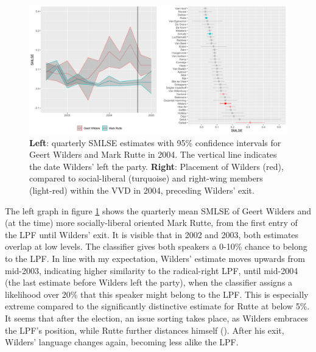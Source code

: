 \documentclass{article}
\begin{document}
\begin{figure}
\includegraphics[width=\linewidth]{NL/vis/Wilders_both.png}
\caption{\textbf{Left}: quarterly SMLSE estimates with 95\% confidence intervals for Geert Wilders and Mark Rutte in 2004. The vertical line indicates the date Wilders' left the party. \textbf{Right}: Placement of Wilders (red), compared to social-liberal (turquoise) and right-wing members (light-red) within the VVD in 2004, preceding Wilders' exit.}
\label{fig:wilders}
\end{figure}

The left graph in figure \ref{fig:wilders} shows the quarterly mean SMLSE of Geert Wilders and (at the time) more socially-liberal oriented Mark Rutte, from the first entry of the LPF until Wilders' exit. It is visible that in 2002 and 2003, both estimates overlap at low levels. The classifier gives both speakers a 0-10\% chance to belong to the LPF. In line with my expectation, Wilders' estimate moves upwards from mid-2003, indicating higher similarity to the radical-right LPF, until mid-2004 (the last estimate before Wilders left the party), when the classifier assigns a likelihood over 20\% that this speaker might belong to the LPF. This is especially extreme compared to the significantly distinctive estimate for Rutte at below 5\%. It seems that after the election, an issue sorting takes place, as Wilders embraces the LPF's position, while Rutte further distances himself (\cite{Carmines1986}). After his exit, Wilders' language changes again, becoming less alike the LPF.\par
\end{document}
